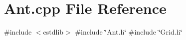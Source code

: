 \section{Ant.\+cpp File Reference}
\label{Ant_8cpp}
{\ttfamily \#include $<$cstdlib$>$}\newline
{\ttfamily \#include \char`\"{}Ant.\+h\char`\"{}}\newline
{\ttfamily \#include \char`\"{}Grid.\+h\char`\"{}}\newline
